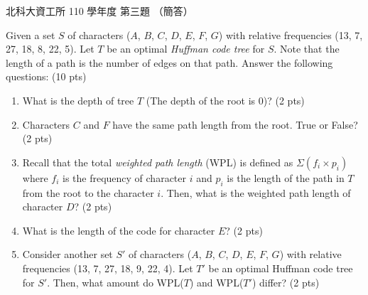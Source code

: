 \begin{pastexam}[label={px:ntut-110-ci-02}]{北科大資工所 110 學年度 第三題}
（簡答）

Given a set $S$ of characters ($A$, $B$, $C$, $D$, $E$, $F$, $G$) with relative frequencies (13, 7,
27, 18, 8, 22, 5). Let $T$ be an optimal \textit{Huffman code tree} for $S$. Note that the length of
a path is the number of edges on that path. Answer the following questions: (10 pts)
\begin{enumerate}[label=(\arabic*)]
\item What is the depth of tree $T$ (The depth of the root is 0)? (2 pts)
\item Characters $C$ and $F$ have the same path length from the root. True or False? (2 pts)
\item Recall that the total \textit{weighted path length} (WPL) is defined as $\Sigma(f_i\times p_i)$
where $f_i$ is the frequency of character $i$ and $p_i$ is the length of the path in $T$ from the
root to the character $i$. Then, what is the weighted path length of character $D$? (2 pts)
\item What is the length of the code for character $E$? (2 pts)
\item Consider another set $S'$ of characters ($A$, $B$, $C$, $D$, $E$, $F$, $G$) with relative
frequencies (13, 7, 27, 18, 9, 22, 4). Let $T'$ be an optimal Huffman code tree for $S'$. Then, what
amount do WPL($T$) and WPL($T'$) differ? (2 pts)
\end{enumerate}
\end{pastexam}

